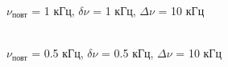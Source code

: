 \documentclass[a4paper,12pt]{article} %
\begin{document}
\begin{enumerate}
	      \begin{figure}[H]
		      \begin{minipage}[h]{0.47\linewidth}
			       $\nu_\text{повт}$  = 1 кГц, $\delta \nu$ = 1 кГц, $\Delta \nu$ = 10 кГц \\
		      \end{minipage}
		      \hfill
		      \begin{minipage}[h]{0.47\linewidth}
			       \\ $\nu_\text{повт}$  = 0.5 кГц, $\delta \nu$ = 0.5 кГц, $\Delta \nu$ = 10 кГц
		      \end{minipage}

\end{figure}
\end{enumerate}
\end{document}
